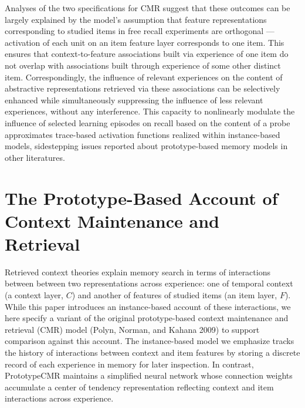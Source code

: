 \documentclass[
  letterpaper,
  DIV=11]{article}
\begin{document}
Analyses of the two specifications for CMR suggest that these outcomes
can be largely explained by the model's assumption that feature
representations corresponding to studied items in free recall
experiments are orthogonal --- activation of each unit on an item
feature layer corresponds to one item. This ensures that
context-to-feature associations built via experience of one item do not
overlap with associations built through experience of some other
distinct item. Correspondingly, the influence of relevant experiences on
the content of abstractive representations retrieved via these
associations can be selectively enhanced while simultaneously
suppressing the influence of less relevant experiences, without any
interference. This capacity to nonlinearly modulate the influence of
selected learning episodes on recall based on the content of a probe
approximates trace-based activation functions realized within
instance-based models, sidestepping issues reported about
prototype-based memory models in other literatures.

\hypertarget{the-prototype-based-account-of-context-maintenance-and-retrieval}{%
\section{The Prototype-Based Account of Context Maintenance and
Retrieval}\label{the-prototype-based-account-of-context-maintenance-and-retrieval}}

Retrieved context theories explain memory search in terms of
interactions between between two representations across experience: one
of temporal context (a context layer, \(C\)) and another of features of
studied items (an item layer, \(F\)). While this paper introduces an
instance-based account of these interactions, we here specify a variant
of the original prototype-based context maintenance and retrieval (CMR)
model (Polyn, Norman, and Kahana 2009) to support comparison against
this account. The instance-based model we emphasize tracks the history
of interactions between context and item features by storing a discrete
record of each experience in memory for later inspection. In contrast,
PrototypeCMR maintains a simplified neural network whose connection
weights accumulate a center of tendency representation reflecting
context and item interactions across experience.
\end{document}
